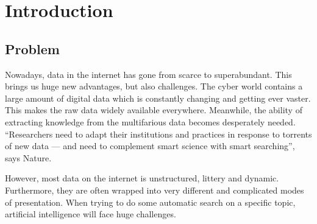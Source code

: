 \chapter{Introduction}\label{chapter:intro}
\section{Problem}
Nowadays, data in the internet has gone from scarce to superabundant. This brings us huge new advantages, but also challenges\cite{1_the_economist_2010}. The cyber world contains a large amount of digital data which is constantly changing and getting ever vaster. This makes the raw data widely available everywhere. Meanwhile, the ability of extracting knowledge from the multifarious data becomes desperately needed. ``Researchers need to adapt their institutions and practices in response to torrents of new data — and need to complement smart science with smart searching'', says Nature\cite{Nature:2008jh}.

However, most data on the internet is unstructured, littery and dynamic. Furthermore, they are often wrapped into very different and complicated modes of presentation. When trying to do some automatic search on a specific topic, artificial intelligence will face huge challenges.\\

